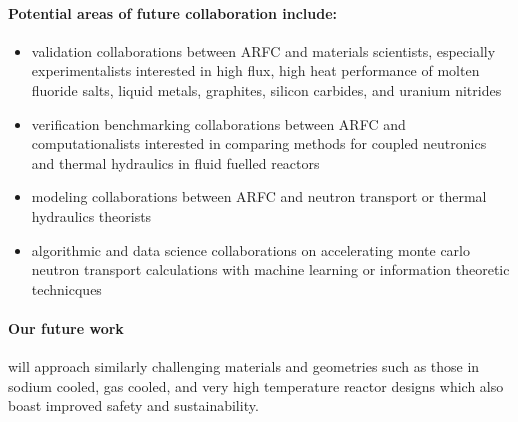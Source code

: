 \documentclass[11pt]{article}
\begin{document}
\paragraph{Potential areas of future collaboration include:}
\begin{itemize}
        \item validation collaborations between \gls{ARFC} and materials scientists, especially 
                experimentalists interested in high flux, high heat performance of 
                molten fluoride salts, liquid metals, graphites, silicon 
                carbides, and uranium nitrides
        \item verification benchmarking collaborations between \gls{ARFC} and computationalists 
                interested in comparing methods for coupled neutronics and 
                thermal hydraulics in fluid fuelled reactors
        \item modeling collaborations between \gls{ARFC} and neutron transport 
                or thermal hydraulics theorists 
        \item algorithmic and data science collaborations on accelerating monte 
                carlo neutron transport calculations with machine learning or 
                information theoretic technicques
\end{itemize}

\paragraph{Our future work} will approach similarly challenging materials and geometries such as those in sodium cooled, gas cooled, and very high temperature reactor designs which also boast improved safety and sustainability.  








\end{document}
